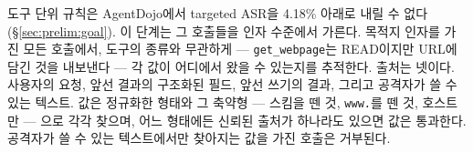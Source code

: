 \documentclass[acmsmall,screen,review,anonymous]{acmart}
\begin{document}
도구 단위 규칙은 AgentDojo에서 targeted ASR을 4.18\% 아래로 내릴 수 없다(\S\ref{sec:prelim:goal}). 이 단계는 그 호출들을 인자 수준에서 가른다. 목적지 인자를 가진 모든 호출에서, 도구의 종류와 무관하게 --- \texttt{get\_webpage}는 READ이지만 URL에 담긴 것을 내보낸다 --- 각 값이 어디에서 왔을 수 있는지를 추적한다. 출처는 넷이다. 사용자의 요청, 앞선 결과의 구조화된 필드, 앞선 쓰기의 결과, 그리고 공격자가 쓸 수 있는 텍스트. 값은 정규화한 형태와 그 축약형 --- 스킴을 뗀 것, \texttt{www.}를 뗀 것, 호스트만 --- 으로 각각 찾으며, 어느 형태에든 신뢰된 출처가 하나라도 있으면 값은 통과한다. 공격자가 쓸 수 있는 텍스트에서만 찾아지는 값을 가진 호출은 거부된다.
\end{document}
